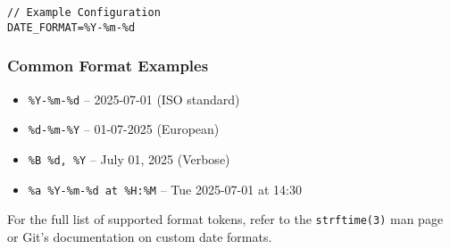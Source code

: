 \begin{lstlisting}[style=cppstyle]
// Example Configuration
DATE_FORMAT=%Y-%m-%d
\end{lstlisting}

\subsubsection*{Common Format Examples}
\begin{itemize}
	\item \texttt{\%Y-\%m-\%d} – 2025-07-01 (ISO standard)
	\item \texttt{\%d-\%m-\%Y} – 01-07-2025 (European)
	\item \texttt{\%B \%d, \%Y} – July 01, 2025 (Verbose)
	\item \texttt{\%a \%Y-\%m-\%d at \%H:\%M} – Tue 2025-07-01 at 14:30
\end{itemize}

For the full list of supported format tokens, refer to the \texttt{strftime(3)}\cite{strftime(3)} man page or Git's documentation on custom date formats.

